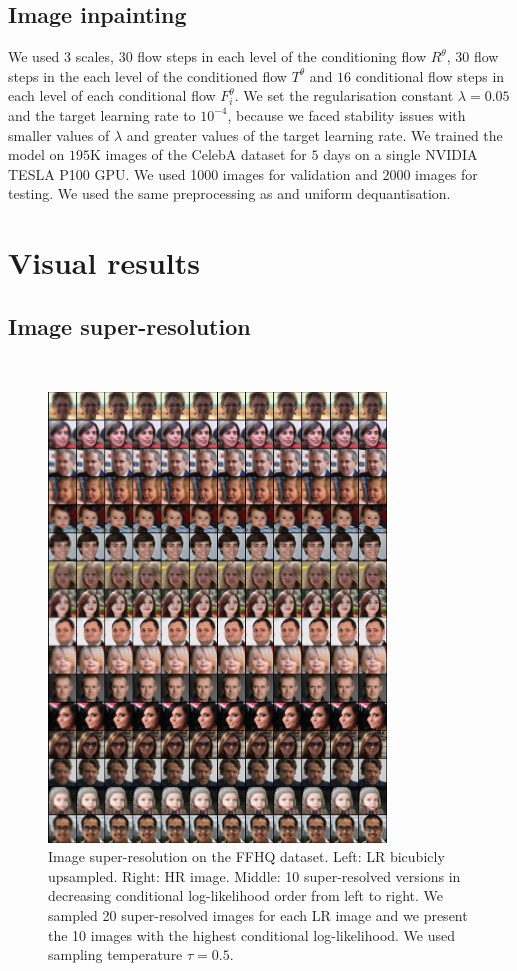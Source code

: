 \subsection{Image inpainting}
We used $3$ scales, $30$ flow steps in each level of the conditioning flow $R^\theta$, $30$ flow steps in the each level of the conditioned flow $T^\theta$ and $16$ conditional flow steps in each level of each conditional flow $F_i^{\theta}$. We set the regularisation constant $\lambda = 0.05$ and the target learning rate to $10^{-4}$, because we faced stability issues with smaller values of $\lambda$ and greater values of the target learning rate. We trained the model on $195$K images of the CelebA dataset for $5$ days on a single NVIDIA TESLA P100 GPU. We used 1000 images for validation and $2000$ images for testing. We used the same preprocessing as  \cite{cGLOW} and uniform dequantisation.

\clearpage
\section{Visual results}\label{ch1:sec:extended-visual-results} %
\subsection{Image super-resolution}\ 

\begin{figure}[h!]
    \centering
    \includegraphics[width=0.8\textwidth]{Chapter1/paper_graphs/SupplementaryMaterial/ffhq_superresolved_2_0.5_cropped.png}
    \caption{Image super-resolution on the FFHQ dataset. Left: LR bicubicly upsampled. Right: HR image. Middle: 10 super-resolved versions in decreasing conditional log-likelihood order from left to right. We sampled 20 super-resolved images for each LR image and we present the 10 images with the highest conditional log-likelihood. We used sampling temperature $\tau=0.5$.}
\end{figure}

